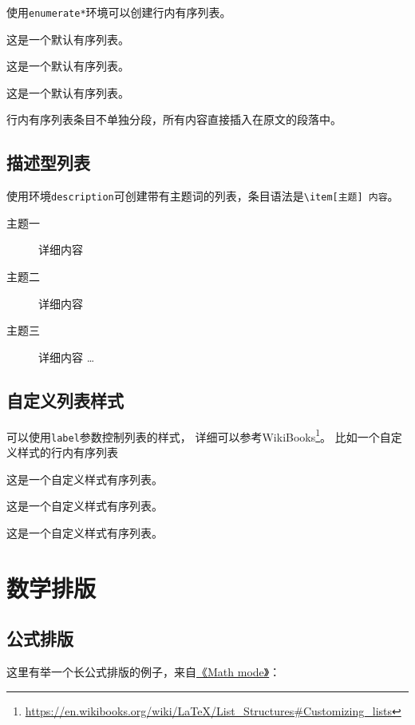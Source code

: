 使用\verb+enumerate*+环境可以创建行内有序列表。
\begin{enumerate*}
  \item 这是一个默认有序列表。
  \item 这是一个默认有序列表。
  \item 这是一个默认有序列表。
\end{enumerate*}
行内有序列表条目不单独分段，所有内容直接插入在原文的段落中。

\subsection{描述型列表}

使用环境\verb+description+可创建带有主题词的列表，条目语法是\verb+\item[主题] 内容+。
\begin{description}
    \item[主题一] 详细内容
    \item[主题二] 详细内容
    \item[主题三] 详细内容 \ldots
\end{description}

\subsection{自定义列表样式}

可以使用\verb+label+参数控制列表的样式，
详细可以参考WikiBooks\footnote{\url{https://en.wikibooks.org/wiki/LaTeX/List_Structures\#Customizing_lists}}。
比如一个自定义样式的行内有序列表
\begin{enumerate*}[label=\itshape\alph*)\upshape]
  \item 这是一个自定义样式有序列表。
  \item 这是一个自定义样式有序列表。
  \item 这是一个自定义样式有序列表。
\end{enumerate*}

\section{数学排版}
\label{sec:matheq}

\subsection{公式排版}
\label{sec:eqformat}

这里有举一个长公式排版的例子，来自\href{http://www.tex.ac.uk/tex-archive/info/math/voss/mathmode/Mathmode.pdf}{《Math mode》}：

